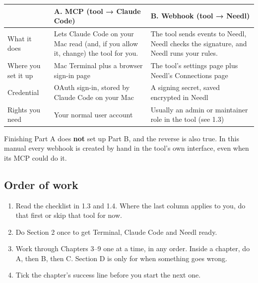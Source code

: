 \documentclass[11pt,a4paper]{article}
\begin{document}
\begin{tabularx}{\textwidth}{@{}L{29mm}YY@{}}
\toprule
 & \textbf{A. MCP (tool → Claude Code)} & \textbf{B. Webhook (tool → Needl)}\\
\midrule
What it does & Lets Claude Code on your Mac read (and, if you allow it, change) the tool for you. & The tool sends events to Needl, Needl checks the signature, and Needl runs your rules.\\
Where you set it up & Mac Terminal plus a browser sign-in page & The tool's settings page plus Needl's Connections page\\
Credential & OAuth sign-in, stored by Claude Code on your Mac & A signing secret, saved encrypted in Needl\\
Rights you need & Your normal user account & Usually an admin or maintainer role in the tool (see 1.3)\\
\bottomrule
\end{tabularx}

Finishing Part A does \textbf{not} set up Part B, and the reverse is also true. In this manual every webhook is created by hand in the tool's own interface, even when its MCP could do it.

\subsection{Order of work}
\begin{enumerate}[label=\textbf{\arabic*.}]
\item Read the checklist in 1.3 and 1.4. Where the last column applies to you, do that first or skip that tool for now.
\item Do Section 2 once to get Terminal, Claude Code and Needl ready.
\item Work through Chapters 3–9 one at a time, in any order. Inside a chapter, do A, then B, then C. Section D is only for when something goes wrong.
\item Tick the chapter's success line before you start the next one.
\end{enumerate}
\end{document}
